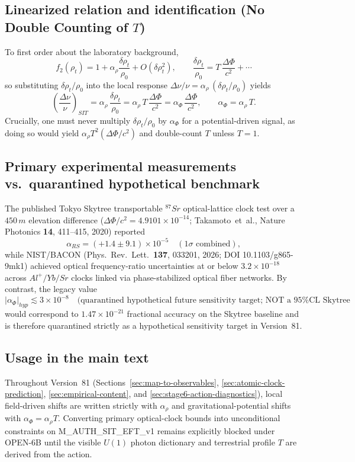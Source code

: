 \documentclass[american,11pt,letterpaper]{article}
\def\mathcal#1{#1}%
\def\mathrm#1{#1}%
\def\texttt#1{#1}%
\def\emph#1{#1}%
\begin{document}
\subsection{Linearized relation and identification (No Double Counting of $\mathcal{T}$)}
To first order about the laboratory background,
\[
f_2(\rho_t) = 1 + \alpha_\rho \frac{\delta \rho_t}{\rho_0} + \mathcal{O}(\delta \rho_t^{2}), \qquad
\frac{\delta \rho_t}{\rho_0} = \mathcal{T}\,\frac{\Delta \Phi}{c^2} + \cdots
\]
so substituting $\delta\rho_t/\rho_0$ into the local response $\Delta\nu/\nu = \alpha_\rho\,(\delta\rho_t/\rho_0)$ yields
\[
\left(\frac{\Delta\nu}{\nu}\right)_{\mathrm{SIT}}
= \alpha_\rho\,\frac{\delta\rho_t}{\rho_0}
= \alpha_\rho\,\mathcal{T}\,\frac{\Delta\Phi}{c^2}
= \alpha_\Phi\,\frac{\Delta\Phi}{c^2},
\qquad
\alpha_\Phi = \alpha_\rho\,\mathcal{T}.
\]
Crucially, one must \emph{never} multiply $\delta\rho_t/\rho_0$ by $\alpha_\Phi$ for a potential-driven signal, as doing so would yield $\alpha_\rho\mathcal{T}^2(\Delta\Phi/c^2)$ and double-count $\mathcal{T}$ unless $\mathcal{T} = 1$.

\subsection{Primary experimental measurements vs.\ quarantined hypothetical benchmark}
The published Tokyo Skytree transportable $^{87}\mathrm{Sr}$ optical-lattice clock test over a $450\,\mathrm{m}$ elevation difference ($\Delta\Phi/c^2 = 4.9101\times 10^{-14}$; Takamoto~\emph{et~al.}, \emph{Nature Photonics} \textbf{14}, 411--415, 2020) reported
\[
\alpha_{\mathrm{RS}} = (+1.4 \pm 9.1) \times 10^{-5} \quad (1\sigma\text{ combined}),
\]
while NIST/BACON (\emph{Phys.\ Rev.\ Lett.}\ \textbf{137}, 033201, 2026; DOI \texttt{10.1103/g865-9mk1}) achieved optical frequency-ratio uncertainties at or below $3.2\times 10^{-18}$ across $\mathrm{Al}^+/\mathrm{Yb}/\mathrm{Sr}$ clocks linked via phase-stabilized optical fiber networks. By contrast, the legacy value
\[
|\alpha_\Phi|_{\mathrm{hyp}} \lesssim 3 \times 10^{-8} \quad \text{(quarantined hypothetical future sensitivity target; NOT a 95\% CL Skytree bound)}
\]
would correspond to $1.47\times 10^{-21}$ fractional accuracy on the Skytree baseline and is therefore quarantined strictly as a hypothetical sensitivity target in Version~81.

\subsection{Usage in the main text}
Throughout Version~81 (Sections~\ref{sec:map-to-observables}, \ref{sec:atomic-clock-prediction}, \ref{sec:empirical-content}, and \ref{sec:stage6-action-diagnostics}), local field-driven shifts are written strictly with $\alpha_\rho$ and gravitational-potential shifts with $\alpha_\Phi = \alpha_\rho\mathcal{T}$. Converting primary optical-clock bounds into unconditional constraints on \texttt{M\_AUTH\_SIT\_EFT\_v1} remains explicitly blocked under \texttt{OPEN-6B} until the visible $U(1)$ photon dictionary and terrestrial profile $\mathcal{T}$ are derived from the action.
\end{document}
